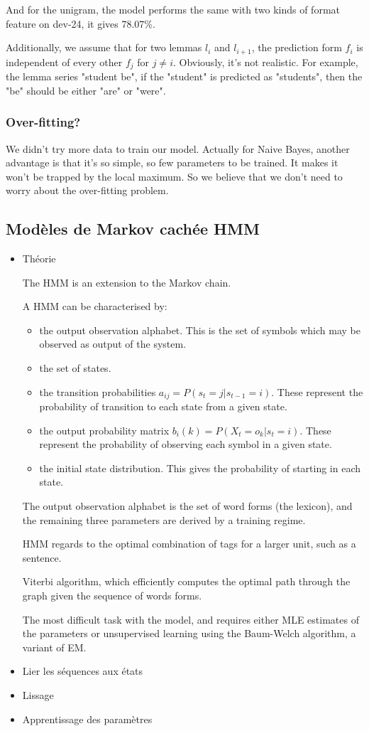 \documentclass[a4paper]{article}
\begin{document}
And for the unigram, the model performs the same with two kinds of format feature on dev-24, it gives 78.07\%.

Additionally, we assume that for two lemmas $l_i$ and $l_{i+1}$, the prediction form $f_{i}$ is independent of every other $f_{j}$ for $j \neq i$. Obviously, it's not realistic. For example, the lemma series "student be", if the "student" is predicted as "students", then the "be" should be either "are" or "were". 

\subsubsection{Over-fitting?}
We didn't try more data to train our model. Actually for Naive Bayes, another advantage is that it's so simple, so few parameters to be trained. It makes it won't be trapped by the local maximum. So we believe that we don't need to worry about the over-fitting problem.

\subsection{Modèles de Markov cachée HMM}
\begin{itemize}
\item Théorie

The HMM is an extension to the Markov chain.



A HMM can be characterised by:
\begin{itemize}
\item the output observation alphabet. This is the set of symbols which may be observed as output of the system.
\item the set of states.
\item the transition probabilities $a_{ij} = P(s_t = j | s_{t-1} = i)$. These represent the probability of transition to each state from a given state.
\item the output probability matrix $b_i(k) = P(X_t = o_k | s_t = i)$. These represent the probability of observing each symbol in a given state.
\item the initial state distribution. This gives the probability of starting in each state.
\end{itemize}

The output observation alphabet is the set of word forms (the lexicon), and the 
remaining three parameters are derived by a training regime.

HMM regards to the optimal combination of tags for a larger unit, such as a sentence.

Viterbi algorithm, which efficiently computes the optimal path through the graph given the sequence of words forms.

The most difficult task with the model, and requires either MLE estimates of the parameters or unsupervised learning using the Baum-Welch algorithm, a variant of EM.


\item Lier les séquences aux états
\item Lissage
\item Apprentissage des paramètres
\end{itemize}
\end{document}
